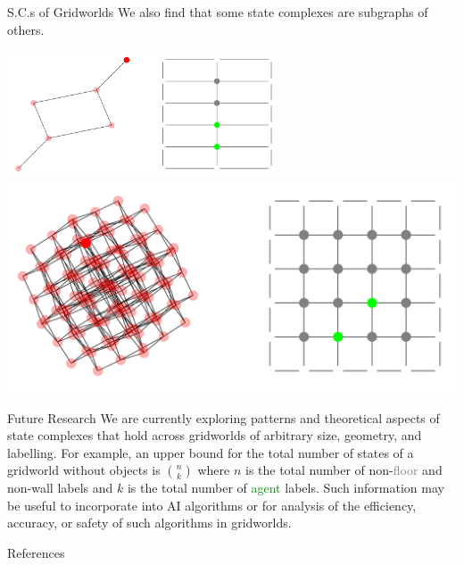 \documentclass[a0paper,landscape, fontscale=0.4]{baposter}
\begin{document}
\begin{poster}
\begin{posterbox}[name=scsofgrids,column=4]{S.C.s of Gridworlds}
We also find that some state complexes are subgraphs of others.

\vspace{0.2cm}
\begin{center}
    \includegraphics[width=0.6\textwidth]{corridor-2.PNG}
    \vspace{0.2cm}
    \includegraphics[width=1\textwidth]{box-4x4-2.PNG}
\end{center}
\end{posterbox}


\begin{posterbox}[name=futureresearch,column=4,below=scsofgrids]{Future Research}
We are currently exploring patterns and theoretical aspects of state complexes that hold across gridworlds of arbitrary size, geometry, and labelling. For example, an upper bound for the total number of states of a gridworld without objects is $\binom{n}{k}$ where $n$ is the total number of non-\textcolor{gray}{floor} and non-wall labels and $k$ is the total number of \textcolor{green}{agent} labels. Such information may be useful to incorporate into AI algorithms or for analysis of the efficiency, accuracy, or safety of such algorithms in gridworlds.
\end{posterbox}


\begin{posterbox}[name=references,below=futureresearch,column=4,bottomaligned=message]{References}
\renewcommand{\section}[2]{} %
\nocite{*} %
\small %

\end{posterbox}


\end{poster}
\end{document}
